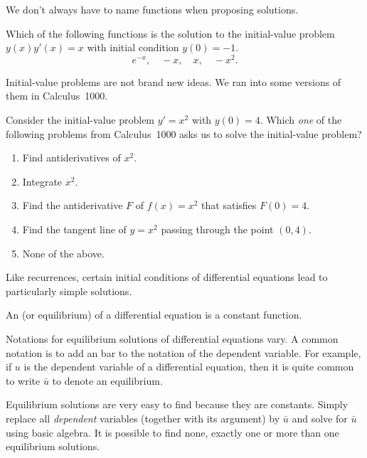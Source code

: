 \documentclass[../main.tex]{subfiles}
\begin{document}
We don't always have to name functions when proposing solutions.
\begin{example}
  Which of the following functions is the solution to the initial-value problem \(y(x)y'(x) = x\) with initial condition \(y(0) = -1\).
  \[
    e^{-x}, \quad -x, \quad x, \quad -x^{2}.
  \]
\end{example}

Initial-value problems are not brand new ideas. We ran into some versions of them in Calculus~1000.
\begin{example} \label{ex:diff-eq-IVP-calc-1000}
  Consider the initial-value problem \(y' = x^{2}\) with \(y(0) = 4\).  Which \emph{one} of the following problems from Calculus~1000 asks us to solve the initial-value problem?

  \begin{enumerate}[label=(\alph*)]
    \item Find antiderivatives of \(x^{2}\).
    \item Integrate \(x^{2}\).
    \item Find the antiderivative \(F\) of \(f(x) = x^{2}\) that satisfies \(F(0) = 4\).
    \item Find the tangent line of \(y = x^{2}\) passing through the point \((0,4)\).
    \item None of the above.
  \end{enumerate}
\end{example}
\clearpage

Like recurrences, certain initial conditions of differential equations lead to particularly simple solutions. 

\begin{definition}
  An  (or equilibrium) of a differential equation is a constant function.  
\end{definition}

Notations for equilibrium solutions of differential equations vary. A common notation is to add an bar to the notation of the dependent variable. For example, if \(u\) is the dependent variable of a differential equation, then it is quite common to write \(\bar{u}\) to denote an equilibrium. 

\faStar{} Equilibrium solutions are very easy to find because they are constants. Simply replace all \emph{dependent} variables (together with its argument) by \(\bar{u}\) and solve for \(\bar{u}\) using basic algebra. It is possible to find none, exactly one or more than one equilibrium solutions.
\end{document}
